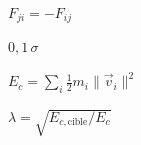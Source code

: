 \documentclass{article}
\begin{document}
$ F_{ji} = -F_{ij} $
\pagebreak

$ 0{,}1\,\sigma $
\pagebreak

$ E_c = \sum_i \frac{1}{2} m_i \|\vec{v}_i\|^2 $
\pagebreak

$ \lambda = \sqrt{E_{c,\text{cible}} / E_c} $
\pagebreak
\end{document}
